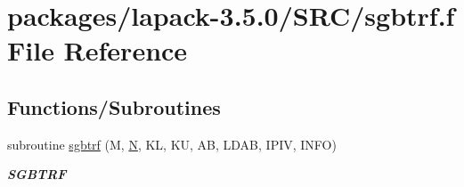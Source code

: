 \hypertarget{sgbtrf_8f}{}\section{packages/lapack-\/3.5.0/\+S\+R\+C/sgbtrf.f File Reference}
\label{sgbtrf_8f}
\subsection*{Functions/\+Subroutines}
\begin{DoxyCompactItemize}
\item 
subroutine \hyperlink{group__realGBcomputational_gacebccf97a748c611292ce5e6b05d2168}{sgbtrf} (M, \hyperlink{polmisc_8c_a0240ac851181b84ac374872dc5434ee4}{N}, K\+L, K\+U, A\+B, L\+D\+A\+B, I\+P\+I\+V, I\+N\+F\+O)
\begin{DoxyCompactList}\small\item\em {\bfseries S\+G\+B\+T\+R\+F} \end{DoxyCompactList}\end{DoxyCompactItemize}
